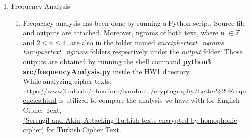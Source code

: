 \documentclass[12pt,a4paper, margin=1in]{article}
\begin{document}
\begin{enumerate}
    \newpage
    \item Frequency Analysis
        \begin{enumerate}
            \item 
            Frequency analysis has been done by running a Python script. Source file and outputs are attached. Moreover, ngrams of both text, where n $\in \mathbb{Z^+}$ and $2\leq n \leq 4$, are also in the folder named \textit{engciphertext\_ngrams, turciphertext\_ngrams} folders respectively under the \textit{output} folder. Those outputs are obtained by running the shell command \textbf{python3 src/frequencyAnalysis.py} inside the HW1 directory.\\
            While analyzing cipher texts:\\ \url{https://www3.nd.edu/~busiforc/handouts/cryptography/Letter\%20Frequencies.html} is utilized to compare the analysis we have with for English Cipher Text,\\
            \href{https://www.researchgate.net/publication/262407127_Attacking_Turkish_texts_encrypted_by_homophonic_cipher}{(Serengil and Akin, Attacking Turkish texts encrypted by homophonic cipher)} for Turkish Cipher Text.\\
            

\end{enumerate}
\end{enumerate}
\end{document}
